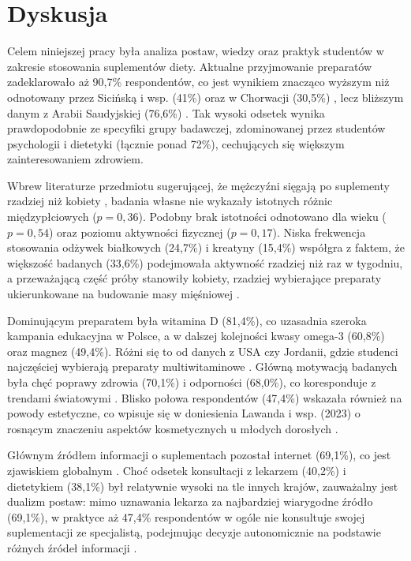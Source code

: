 \section{Dyskusja}\label{Dyskusja}

Celem niniejszej pracy była analiza postaw, wiedzy oraz praktyk studentów w zakresie stosowania suplementów diety. Aktualne przyjmowanie preparatów zadeklarowało aż 90,7\% respondentów, co jest wynikiem znacząco wyższym niż odnotowany przez Sicińską i wsp. (41\%) oraz w Chorwacji (30,5\%) \cite{diet-lifestyle, croatia-knowledge-and-use}, lecz bliższym danym z Arabii Saudyjskiej (76,6\%) \cite{alfawaz2017prevalence}. Tak wysoki odsetek wynika prawdopodobnie ze specyfiki grupy badawczej, zdominowanej przez studentów psychologii i dietetyki (łącznie ponad 72\%), cechujących się większym zainteresowaniem zdrowiem. 

Wbrew literaturze przedmiotu sugerującej, że mężczyźni sięgają po suplementy rzadziej niż kobiety \cite{sicinska2022dietary, vidovic2022dietary}, badania własne nie wykazały istotnych różnic międzypłciowych ($p = 0,36$). Podobny brak istotności odnotowano dla wieku ($p = 0,54$) oraz poziomu aktywności fizycznej ($p = 0,17$). Niska frekwencja stosowania odżywek białkowych (24,7\%) i kreatyny (15,4\%) współgra z faktem, że większość badanych (33,6\%) podejmowała aktywność rzadziej niż raz w tygodniu, a przeważającą część próby stanowiły kobiety, rzadziej wybierające preparaty ukierunkowane na budowanie masy mięśniowej \cite{vidovic2022dietary, radwan2019prevalence}.

Dominującym preparatem była witamina D (81,4\%), co uzasadnia szeroka kampania edukacyjna w Polsce, a w dalszej kolejności kwasy omega-3 (60,8\%) oraz magnez (49,4\%). Różni się to od danych z USA czy Jordanii, gdzie studenci najczęściej wybierają preparaty multiwitaminowe \cite{lieberman2015patterns, knowledge-and-use}. Główną motywacją badanych była chęć poprawy zdrowia (70,1\%) i odporności (68,0\%), co koresponduje z trendami światowymi \cite{sundgot2022explanations}. Blisko połowa respondentów (47,4\%) wskazała również na powody estetyczne, co wpisuje się w doniesienia Lawanda i wsp. (2023) o rosnącym znaczeniu aspektów kosmetycznych u młodych dorosłych \cite{lawand2023assessment}.

Głównym źródłem informacji o suplementach pozostał internet (69,1\%), co jest zjawiskiem globalnym \cite{kobayashi2017prevalence}. Choć odsetek konsultacji z lekarzem (40,2\%) i dietetykiem (38,1\%) był relatywnie wysoki na tle innych krajów, zauważalny jest dualizm postaw: mimo uznawania lekarza za najbardziej wiarygodne źródło (69,1\%), w praktyce aż 47,4\% respondentów w ogóle nie konsultuje swojej suplementacji ze specjalistą, podejmując decyzje autonomicznie na podstawie różnych źródeł informacji \cite{steele2005dietary}.

